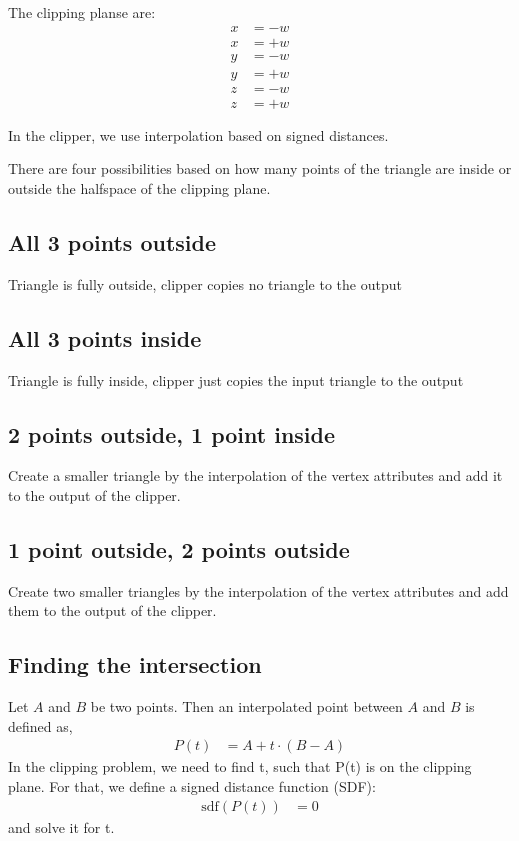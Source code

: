 The clipping planse are:
\begin{equation}
\begin{aligned}
x  &= -w\\
x  &= +w\\ 
y  &= -w\\
y  &= +w\\
z  &= -w\\
z  &= +w
\end{aligned}
\label{eq:clipping_planes}
\end{equation}

In the clipper, we use interpolation based on signed distances.

There are four possibilities based on how many points of the triangle are inside or outside the halfspace of the clipping plane.

\subsection{All 3 points outside}
Triangle is fully outside, clipper copies no triangle to the output

\subsection{All 3 points inside}
Triangle is fully inside, clipper just copies the input triangle to the output

\subsection{2 points outside, 1 point inside}
Create a smaller triangle by the interpolation of the vertex attributes and add it to the output of the clipper.

\subsection{1 point outside, 2 points outside}
Create two smaller triangles by the interpolation of the vertex attributes and add them to the output of the clipper.

\subsection{Finding the intersection}
Let $A$ and $B$ be two points.
Then an interpolated point between $A$ and $B$ is defined as,
\begin{align*}
P(t) &= A + t \cdot (B - A)
\end{align*}
In the clipping problem, we need to find t, such that P(t) is on the clipping plane.
For that, we define a signed distance function (SDF):
\begin{align*}
\text{sdf}(P(t)) &= 0
\end{align*}
and solve it for t.

